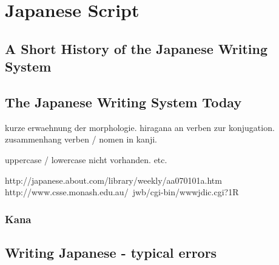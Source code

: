 
\chapter{Japanese Script}
\label{sec:japansescript}

\minitoc

\section{A Short History of the Japanese Writing System}
\label{sec:ahorthistoryofjapanesewritingsystem}

\section{The Japanese Writing System Today}
\label{sec:japanesewritingsystemtoday}

kurze erwaehnung der morphologie. hiragana an verben zur konjugation.
zusammenhang verben / nomen in kanji.

uppercase / lowercase nicht vorhanden. etc.

http://japanese.about.com/library/weekly/aa070101a.htm
http://www.csse.monash.edu.au/~jwb/cgi-bin/wwwjdic.cgi?1R

\subsection{Kana}
\label{sec:kana}

\section{Writing Japanese - typical errors}
\label{sec:writingjapanesetypicalerrors}

